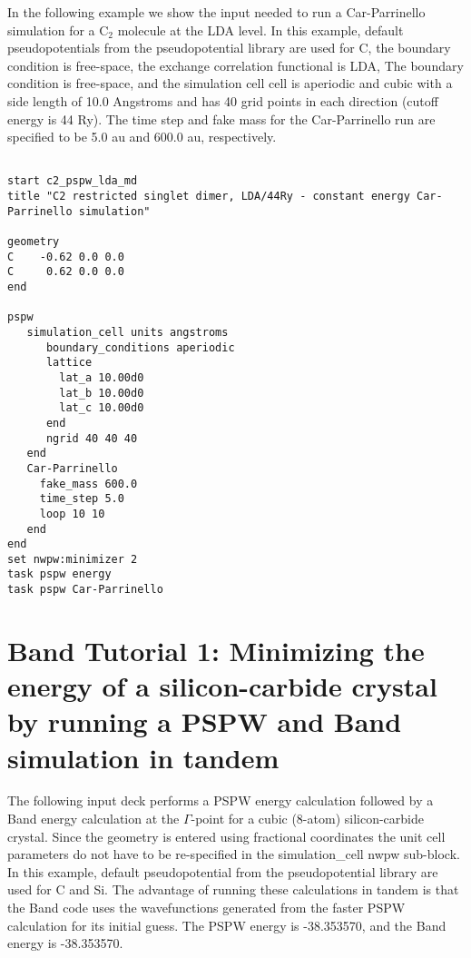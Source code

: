 In the following example we show the input needed to run a Car-Parrinello simulation
for a C$_2$ molecule at the LDA level.  In this example, default pseudopotentials
from the pseudopotential library are used for C, the boundary condition is free-space, 
the exchange correlation functional is LDA, The boundary condition is free-space, and 
the simulation cell cell is aperiodic and cubic with a side length of 10.0 Angstroms and has
40 grid points in each direction (cutoff energy is 44 Ry).  The time step and fake mass
for the Car-Parrinello run are specified to be 5.0 au and 600.0 au, respectively.  

\begin{verbatim}
         
start c2_pspw_lda_md
title "C2 restricted singlet dimer, LDA/44Ry - constant energy Car-Parrinello simulation"

geometry  
C    -0.62 0.0 0.0
C     0.62 0.0 0.0
end
       
pspw
   simulation_cell units angstroms
      boundary_conditions aperiodic
      lattice
        lat_a 10.00d0
        lat_b 10.00d0
        lat_c 10.00d0
      end
      ngrid 40 40 40
   end
   Car-Parrinello
     fake_mass 600.0
     time_step 5.0
     loop 10 10
   end
end
set nwpw:minimizer 2
task pspw energy
task pspw Car-Parrinello
\end{verbatim}



\normalsize
\section{Band Tutorial 1: Minimizing the energy of a silicon-carbide crystal by running a PSPW and Band simulation in tandem}
\label{sec:band_tutorial1}
\normalsize

The following input deck performs a PSPW energy calculation followed
by a Band energy calculation at the $\Gamma$-point  for a cubic (8-atom) 
silicon-carbide crystal.  Since the geometry is entered using fractional coordinates
the unit cell parameters do not have to be re-specified in the simulation\_cell
nwpw sub-block.  In this example, default pseudopotential from the pseudopotential
library are used for C and Si.  The advantage of running these calculations in tandem is that
the Band code uses the wavefunctions generated from the faster PSPW calculation for
its initial guess.  The PSPW energy is -38.353570, and the Band energy is -38.353570.
 
